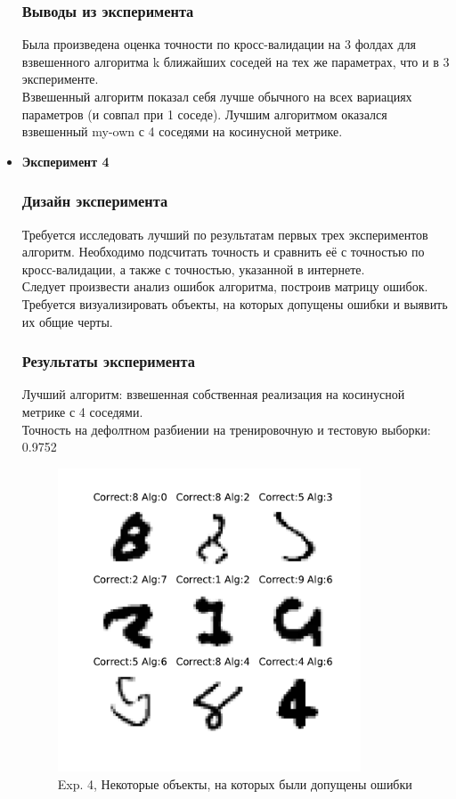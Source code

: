 \documentclass[10pt]{article}
\begin{document}
\begin{itemize}
		    \subsubsection*{Выводы из эксперимента}
		    {
		    	Была произведена оценка точности по кросс-валидации на 3 фолдах для взвешенного алгоритма k ближайших соседей на тех же параметрах, что и в 3 эксперименте.\\
		    	Взвешенный алгоритм показал себя лучше обычного на всех вариациях параметров (и совпал при 1 соседе). Лучшим алгоритмом оказался взвешенный my-own с 4  
		    	соседями на косинусной метрике.
		    }
			
		\item {\bf Эксперимент 4}
		    \subsubsection*{Дизайн эксперимента}
		    {
		    	Требуется исследовать лучший по результатам первых трех экспериментов алгоритм. Необходимо подсчитать точность и сравнить её с точностью по кросс-валидации, а также с точностью, указанной в интернете.\\
		    	Следует произвести анализ ошибок алгоритма, построив матрицу ошибок.\\
		    	Требуется визуализировать объекты, на которых допущены ошибки и выявить их общие черты.
		    }
		    
		    \subsubsection*{Результаты эксперимента}
		    {	    
		    	Лучший алгоритм: взвешенная собственная реализация на косинусной метрике с 4 соседями.\\
		    	Точность на дефолтном разбиении на тренировочную и тестовую выборки: 0.9752\\
		    	\begin{figure}[h]
		    		\includegraphics[width=9cm, height=9cm]{experiment4_errors_subset.pdf}
		    		\caption{Exp. 4, Некоторые объекты, на которых были допущены ошибки}
		    		\label{ris:image5}
		    	\end{figure}
		    }
		    

\end{itemize}
\end{document}
